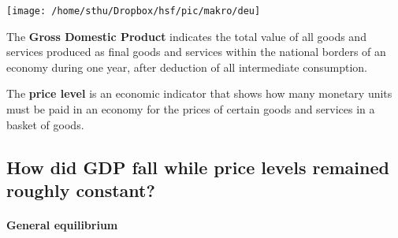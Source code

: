 
\begin{minipage}{0.6\textwidth}
\begin{center}
	\texttt{[image: /home/sthu/Dropbox/hsf/pic/makro/deu]}\label{fig:deu}
\end{center}
\end{minipage}
\begin{minipage}{0.4\textwidth}
The \textbf{Gross Domestic Product} indicates the total value of all goods and services produced as final goods and services within the national borders of an economy during one year, after deduction of all intermediate consumption.

The \textbf{price level} is an economic indicator that shows how many monetary units must be paid in an economy for the prices of certain goods and services in a basket of goods.  
\end{minipage}


\pbn
\subsection{How did GDP fall while price levels remained roughly constant?}


\paragraph{General equilibrium}

